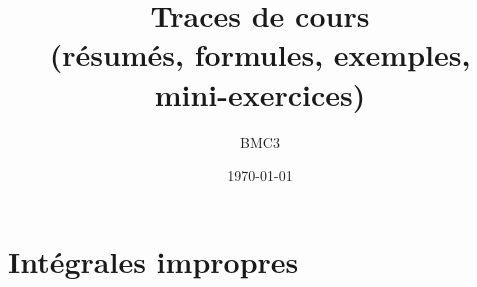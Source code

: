 \documentclass[11pt,a4paper]{report}
\title{\textbf{Traces de cours}\\\large (résumés, formules, exemples, mini-exercices)}
\author{ BMC3 }
\date{\today}
\begin{document}

% 

% 

% 

% 

% 

% 

% 

% 
% 

% 

\setcounter{chapter}{7}
\chapter{Intégrales impropres}

\end{document}
